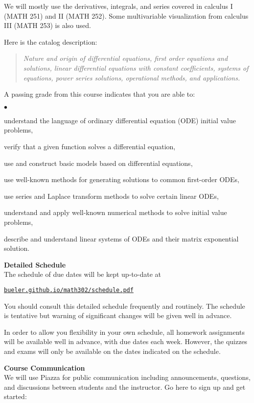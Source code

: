 \documentclass[12pt]{article}
\renewcommand{\emph}[1]{\textsf{\textbf{#1}}}
\newcommand{\localhead}[1]{\par\smallskip\textbf{#1}\nobreak\\}%
\def\heading#1{\localhead{\large\emph{#1}}}
\newenvironment{clist}%
{\bgroup\parskip 0pt\begin{list}{$\bullet$}{\partopsep 4pt\topsep 0pt\itemsep -2pt}}%
{\end{list}\egroup}%
\begin{document}
We will mostly use the derivatives, integrals, and series covered in calculus I (MATH 251) and II (MATH 252).  Some multivariable visualization from calculus III (MATH 253) is also used.

Here is the catalog description:
\begin{quote}
\textsl{Nature and origin of differential equations, first order equations and solutions, linear differential equations with constant coefficients, systems of equations, power series solutions, operational methods, and applications.}
\end{quote}

A passing grade from this course indicates that you are able to:

\begin{clist}
\item understand the language of ordinary differential equation (ODE) initial value problems,
\item verify that a given function solves a differential equation,
\item use and construct basic models based on differential equations,
\item use well-known methods for generating solutions to common first-order ODEs,
\item use series and Laplace transform methods to solve certain linear ODEs,
\item understand and apply well-known numerical methods to solve initial value problems,
\item describe and understand linear systems of ODEs and their matrix exponential solution.
\end{clist}


\heading{Detailed Schedule}
The schedule of due dates will be kept up-to-date at

\smallskip
\centerline{\href{https://bueler.github.io/math302/schedule.pdf}{\tt bueler.github.io/math302/schedule.pdf}}

You should consult this detailed schedule frequently and routinely.  The schedule is tentative but warning of significant changes will be given well in advance.

In order to allow you flexibility in your own schedule, all homework assignments will be available well in advance, with due dates each week.  However, the quizzes and exams will only be available on the dates indicated on the schedule.


\heading{Course Communication}
We will use Piazza for public communication including announcements, questions, and discussions between students and the instructor.  Go here to sign up and get started:
\end{document}
